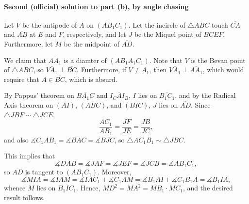 \paragraph{Second (official) solution to part (b), by angle chasing}     Let $V$ be the antipode of $A$ on $(AB_1C_1)$. Let the incircle of $\triangle ABC$ touch $\overline{CA}$ and $\overline{AB}$ at $E$ and $F$, respectively, and let $J$ be the Miquel point of $BCEF$. Furthermore, let $M$ be the midpoint of $\overline{AD}$.

We claim that $\overline{AA_1}$ is a diamter of $(AB_1A_1C_1)$. Note that $V$ is the Bevan point of $\triangle ABC$, so $\overline{VA_1}\perp\overline{BC}$. Furthermore, if $V\ne A_1$, then $\overline{VA_1}\perp\overline{AA_1}$, which would require that $A\in\overline{BC}$, which is absurd.

By Pappus' theorem on $\overline{BA_1C}$ and $\overline{I_CAI_B}$, $I$ lies on $\overline{B_1C_1}$, and by the Radical Axis theorem on $(AI)$, $(ABC)$, and $(BIC)$, $J$ lies on $\overline{AD}$. Since $\triangle JBF\sim\triangle JCE$, \[\frac{AC_1}{AB_1}=\frac{JF}{JE}=\frac{JB}{JC},\]
and also $\measuredangle C_1AB_1=\measuredangle BAC=\measuredangle BJC$, so $\triangle AC_1B_1\sim\triangle JBC$. 

This implies that \[\measuredangle DAB=\measuredangle JAF=\measuredangle JEF=\measuredangle JCB=\measuredangle AB_1C_1,\]
so $\overline{AD}$ is tangent to $(AB_1C_1)$. Moreover, \[\measuredangle MIA=\measuredangle IAM=\measuredangle IAC_1+\measuredangle C_1AM=\measuredangle B_1AI+\measuredangle C_1B_1A=\measuredangle B_1IA,\]
whence $M$ lies on $\overline{B_1IC_1}$. Hence, $MD^2=MA^2=MB_1\cdot MC_1$, and the desired result follows. 


